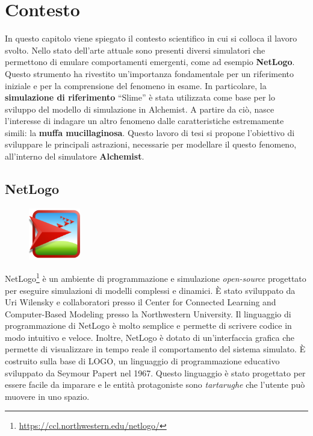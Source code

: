 \chapter{Contesto}
In questo capitolo viene spiegato il contesto scientifico in cui si colloca il lavoro svolto.
Nello stato dell'arte attuale sono presenti diversi simulatori che permettono di emulare comportamenti emergenti, come ad esempio \textbf{NetLogo}.
Questo strumento ha rivestito un'importanza fondamentale per un riferimento iniziale e per la comprensione del fenomeno in esame.
In particolare, la \textbf{simulazione di riferimento} ``Slime'' è stata utilizzata come base per lo sviluppo del modello di simulazione in Alchemist.
A partire da ciò, nasce l'interesse di indagare un altro fenomeno dalle caratteristiche estremamente simili: la \textbf{muffa mucillaginosa}.
Questo lavoro di tesi si propone l'obiettivo di sviluppare le principali astrazioni, necessarie per modellare il questo fenomeno,
all'interno del simulatore \textbf{Alchemist}.

\section{NetLogo}

\begin{figure}
    \centering
    \includegraphics[width=0.2\textwidth]{figures/net.png}
\end{figure}

NetLogo\footnote{\url{https://ccl.northwestern.edu/netlogo/}}\space\cite{wilensky1997netlogo} è un ambiente di programmazione e simulazione \textit{open-source}
progettato per eseguire simulazioni di modelli complessi e dinamici. È stato sviluppato da Uri Wilensky
e collaboratori presso il Center for Connected Learning and Computer-Based Modeling presso la Northwestern University.
Il linguaggio di programmazione di NetLogo è molto semplice e permette di scrivere codice in modo
intuitivo e veloce. Inoltre, NetLogo è dotato di un'interfaccia grafica che permette di visualizzare
in tempo reale il comportamento del sistema simulato.
È costruito sulla base di LOGO, un linguaggio di programmazione educativo sviluppato
da Seymour Papert nel 1967. Questo linguaggio è stato progettato per essere facile da imparare e le entità protagoniste
sono \textit{tartarughe} che l'utente può muovere in uno spazio.

